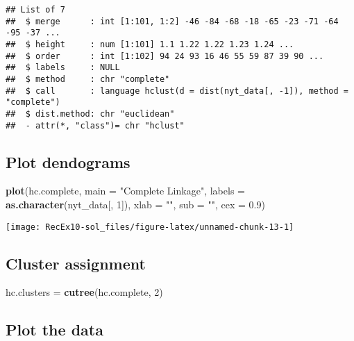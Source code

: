 \documentclass[]{article}
\newenvironment{Shaded}{\begin{snugshade}}{\end{snugshade}}
\newcommand{\DataTypeTok}[1]{\textcolor[rgb]{0.13,0.29,0.53}{#1}}
\newcommand{\DecValTok}[1]{\textcolor[rgb]{0.00,0.00,0.81}{#1}}
\newcommand{\FloatTok}[1]{\textcolor[rgb]{0.00,0.00,0.81}{#1}}
\newcommand{\KeywordTok}[1]{\textcolor[rgb]{0.13,0.29,0.53}{\textbf{#1}}}
\newcommand{\NormalTok}[1]{#1}
\newcommand{\StringTok}[1]{\textcolor[rgb]{0.31,0.60,0.02}{#1}}
\begin{document}
\begin{verbatim}
## List of 7
##  $ merge      : int [1:101, 1:2] -46 -84 -68 -18 -65 -23 -71 -64 -95 -37 ...
##  $ height     : num [1:101] 1.1 1.22 1.22 1.23 1.24 ...
##  $ order      : int [1:102] 94 24 93 16 46 55 59 87 39 90 ...
##  $ labels     : NULL
##  $ method     : chr "complete"
##  $ call       : language hclust(d = dist(nyt_data[, -1]), method = "complete")
##  $ dist.method: chr "euclidean"
##  - attr(*, "class")= chr "hclust"
\end{verbatim}

\hypertarget{plot-dendograms}{%
\subsection{Plot dendograms}\label{plot-dendograms}}

\begin{Shaded}
\begin{Highlighting}[]
\KeywordTok{plot}\NormalTok{(hc.complete, }\DataTypeTok{main =} \StringTok{"Complete Linkage"}\NormalTok{, }\DataTypeTok{labels =} \KeywordTok{as.character}\NormalTok{(nyt_data[, }
    \DecValTok{1}\NormalTok{]), }\DataTypeTok{xlab =} \StringTok{""}\NormalTok{, }\DataTypeTok{sub =} \StringTok{""}\NormalTok{, }\DataTypeTok{cex =} \FloatTok{0.9}\NormalTok{)}
\end{Highlighting}
\end{Shaded}

\begin{center}\texttt{[image: RecEx10-sol\_files/figure-latex/unnamed-chunk-13-1]} \end{center}

\hypertarget{cluster-assignment}{%
\subsection{Cluster assignment}\label{cluster-assignment}}

\begin{Shaded}
\begin{Highlighting}[]
\NormalTok{hc.clusters =}\StringTok{ }\KeywordTok{cutree}\NormalTok{(hc.complete, }\DecValTok{2}\NormalTok{)}
\end{Highlighting}
\end{Shaded}

\hypertarget{plot-the-data-1}{%
\subsection{Plot the data}\label{plot-the-data-1}}
\end{document}
